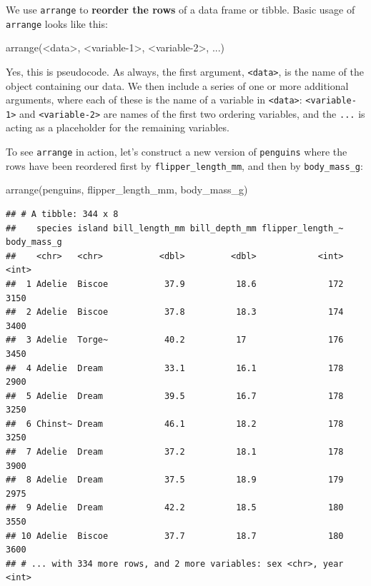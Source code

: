 \documentclass[
]{book}
\newenvironment{Shaded}{\begin{snugshade}}{\end{snugshade}}
\newcommand{\DecValTok}[1]{\textcolor[rgb]{0.00,0.00,0.81}{#1}}
\newcommand{\FunctionTok}[1]{\textcolor[rgb]{0.00,0.00,0.00}{#1}}
\newcommand{\NormalTok}[1]{#1}
\newcommand{\SpecialCharTok}[1]{\textcolor[rgb]{0.00,0.00,0.00}{#1}}
\begin{document}
We use \texttt{arrange} to \textbf{reorder the rows} of a data frame or tibble. Basic usage of \texttt{arrange} looks like this:

\begin{Shaded}
\begin{Highlighting}[]
\FunctionTok{arrange}\NormalTok{(}\SpecialCharTok{\textless{}}\NormalTok{data}\SpecialCharTok{\textgreater{}}\NormalTok{, }\SpecialCharTok{\textless{}}\NormalTok{variable}\DecValTok{{-}1}\SpecialCharTok{\textgreater{}}\NormalTok{, }\SpecialCharTok{\textless{}}\NormalTok{variable}\DecValTok{{-}2}\SpecialCharTok{\textgreater{}}\NormalTok{, ...)}
\end{Highlighting}
\end{Shaded}

Yes, this is pseudocode. As always, the first argument, \texttt{\textless{}data\textgreater{}}, is the name of the object containing our data. We then include a series of one or more additional arguments, where each of these is the name of a variable in \texttt{\textless{}data\textgreater{}}: \texttt{\textless{}variable-1\textgreater{}} and \texttt{\textless{}variable-2\textgreater{}} are names of the first two ordering variables, and the \texttt{...} is acting as a placeholder for the remaining variables.

To see \texttt{arrange} in action, let's construct a new version of \texttt{penguins} where the rows have been reordered first by \texttt{flipper\_length\_mm}, and then by \texttt{body\_mass\_g}:

\begin{Shaded}
\begin{Highlighting}[]
\FunctionTok{arrange}\NormalTok{(penguins, flipper\_length\_mm, body\_mass\_g)}
\end{Highlighting}
\end{Shaded}

\begin{verbatim}
## # A tibble: 344 x 8
##    species island bill_length_mm bill_depth_mm flipper_length_~ body_mass_g
##    <chr>   <chr>           <dbl>         <dbl>            <int>       <int>
##  1 Adelie  Biscoe           37.9          18.6              172        3150
##  2 Adelie  Biscoe           37.8          18.3              174        3400
##  3 Adelie  Torge~           40.2          17                176        3450
##  4 Adelie  Dream            33.1          16.1              178        2900
##  5 Adelie  Dream            39.5          16.7              178        3250
##  6 Chinst~ Dream            46.1          18.2              178        3250
##  7 Adelie  Dream            37.2          18.1              178        3900
##  8 Adelie  Dream            37.5          18.9              179        2975
##  9 Adelie  Dream            42.2          18.5              180        3550
## 10 Adelie  Biscoe           37.7          18.7              180        3600
## # ... with 334 more rows, and 2 more variables: sex <chr>, year <int>
\end{verbatim}
\end{document}
